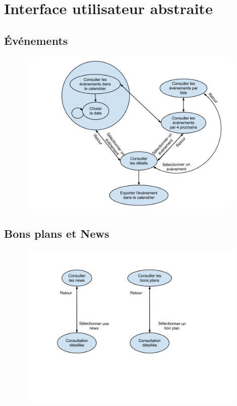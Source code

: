 \documentclass[a4paper, 11px]{article}
\begin{document}
\section{Interface utilisateur abstraite}
\subsection{Événements}
\vfill
\begin{figure}[h!]
\includegraphics[width=18cm,height=8cm]{IUAevenements.png}
\end{figure}
\subsection{Bons plans et News}

\begin{figure}[h!]
\includegraphics[width=18cm,height=8cm]{IUAnewsbonsplans.png}
\end{figure}
\vfill
\clearpage
\end{document}
